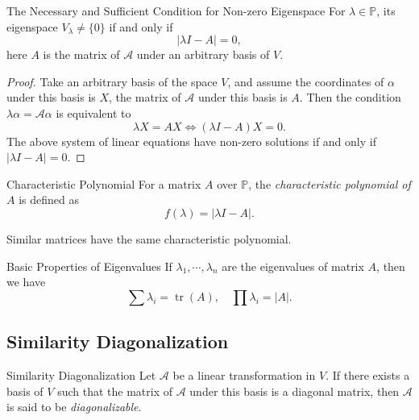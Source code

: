 \begin{proposition}{The Necessary and Sufficient Condition for Non-zero Eigenspace}{}
  For $\lambda \in \mathbb{P}$, its eigenspace $V_{\lambda} \neq \{0\}$ if and
  only if
  \begin{equation}
    |\lambda I - A| = 0,
  \end{equation}
  here $A$ is the matrix of $\mathcal{A}$ under an arbitrary basis of $V$.
\end{proposition}

\begin{proof}
  Take an arbitrary basis of the space $V$,
  and assume the coordinates of $\alpha$ under this basis is $X$,
  the matrix of $\mathcal{A}$ under this basis is $A$.
  Then the condition $\lambda \alpha = \mathcal{A}\alpha$ is equivalent to
  \begin{equation}
    \lambda X = A X \Leftrightarrow (\lambda I - A)X = 0.
  \end{equation}
  The above system of linear equations have non-zero solutions if and only if $|\lambda I
  - A| = 0$.
\end{proof}

\begin{definition}{Characteristic Polynomial}{}
  For a matrix $A$ over $\mathbb{P}$,
  the \emph{characteristic polynomial of $A$} is defined as
  \begin{equation}
    f(\lambda) = |\lambda I - A|.
  \end{equation}
\end{definition}

\begin{proposition}{}{}
  Similar matrices have the same characteristic polynomial.
\end{proposition}

\begin{proposition}{Basic Properties of Eigenvalues}{}
  If $\lambda_1,\cdots,\lambda_n$ are the eigenvalues of matrix $A$,
  then we have
  \begin{equation}
    \sum \lambda_i = \operatorname{tr}(A),\quad
    \prod \lambda_i = |A|.
  \end{equation}
\end{proposition}

\subsection{Similarity Diagonalization}

\begin{definition}{Similarity Diagonalization}{}
  Let $\mathcal{A}$ be a linear transformation in $V$.
  If there exists a basis of $V$ such that the matrix of $\mathcal{A}$
  under this basis is a diagonal matrix,
  then $\mathcal{A}$ is said to be \emph{diagonalizable}.
\end{definition}

